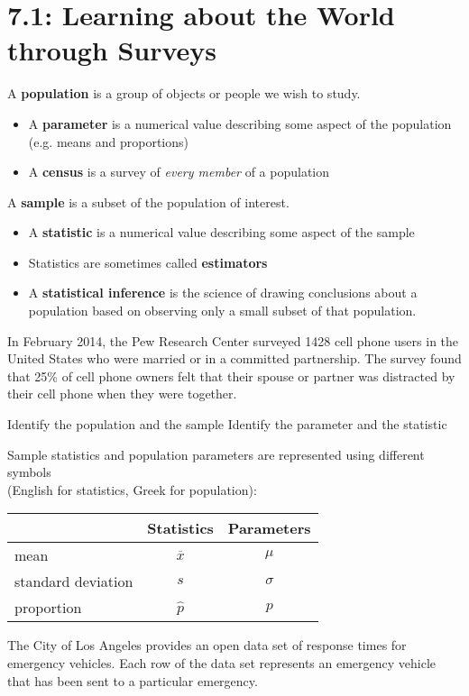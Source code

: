 \documentclass[../mathNotesPreamble]{subfiles}
\begin{document}
  \section{7.1: Learning about the World through Surveys}

    \begin{defn*}
      A \textbf{population} is a group of objects or people we wish to study.
      \begin{itemize}
        \item A \textbf{parameter} is a numerical value describing some aspect of the population\\ (e.g. means and proportions)
        \item A \textbf{census} is a survey of \emph{every member} of a population
      \end{itemize}
      A \textbf{sample} is a subset of the population of interest.
      \begin{itemize}
        \item A \textbf{statistic} is a numerical value describing some aspect of the sample
        \item Statistics are sometimes called \textbf{estimators}
        \item A \textbf{statistical inference} is the science of drawing conclusions about a population based on observing only a small subset of that population.
      \end{itemize}
    \end{defn*}

    \begin{ex*}
      In February 2014, the Pew Research Center surveyed 1428 cell phone users in the United States who were married or in a committed partnership. The survey found that 25\% of cell phone owners felt that their spouse or partner was distracted by their cell phone when they were together.
    \end{ex*}

    \begin{extasks}[after-item-skip=\stretch{1}]
      \task Identify the population and the sample
      \task Identify the parameter and the statistic
    \end{extasks}
    \pagebreak

    \noindent
    Sample statistics and population parameters are represented using different symbols\\ (English for statistics, Greek for population):
    \begin{center}
      \begin{tabular}{@{}l*{2}{c}@{}}\toprule
        & Statistics & Parameters \\\midrule
        mean & $\overline{x}$ & $\mu$ \\
        standard deviation & $s$ & $\sigma$\\
        proportion & $\hat{p}$ & $p$\\\bottomrule
      \end{tabular}
    \end{center}

  \begin{ex*}
    The City of Los Angeles provides an open data set of response times for emergency vehicles. Each row of the data set represents an emergency vehicle that has been sent to a particular emergency.
  \end{ex*}
    

  \pagebreak
\end{document}
